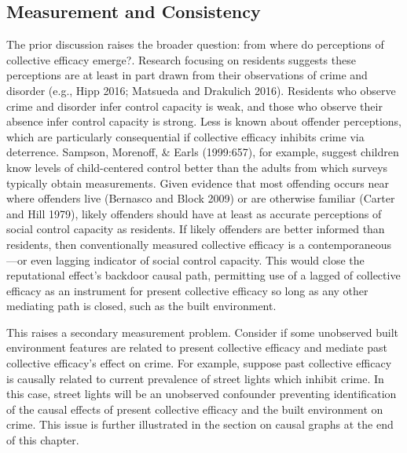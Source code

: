 \documentclass [11pt, proquest] {uwthesis}[2015/03/03]
\begin{document}
\hypertarget{measurement-and-consistency}{%
\subsection{Measurement and Consistency}\label{measurement-and-consistency}}

The prior discussion raises the broader question: from where do perceptions of collective efficacy emerge?. Research focusing on residents suggests these perceptions are at least in part drawn from their observations of crime and disorder (e.g., Hipp 2016; Matsueda and Drakulich 2016). Residents who observe crime and disorder infer control capacity is weak, and those who observe their absence infer control capacity is strong. Less is known about offender perceptions, which are particularly consequential if collective efficacy inhibits crime via deterrence. Sampson, Morenoff, \& Earls (1999:657), for example, suggest children know levels of child-centered control better than the adults from which surveys typically obtain measurements. Given evidence that most offending occurs near where offenders live (Bernasco and Block 2009) or are otherwise familiar (Carter and Hill 1979), likely offenders should have at least as accurate perceptions of social control capacity as residents. If likely offenders are better informed than residents, then conventionally measured collective efficacy is a contemporaneous---or even lagging indicator of social control capacity. This would close the reputational effect's backdoor causal path, permitting use of a lagged of collective efficacy as an instrument for present collective efficacy so long as any other mediating path is closed, such as the built environment.

This raises a secondary measurement problem. Consider if some unobserved built environment features are related to present collective efficacy and mediate past collective efficacy's effect on crime. For example, suppose past collective efficacy is causally related to current prevalence of street lights which inhibit crime. In this case, street lights will be an unobserved confounder preventing identification of the causal effects of present collective efficacy and the built environment on crime. This issue is further illustrated in the section on causal graphs at the end of this chapter.
\end{document}

